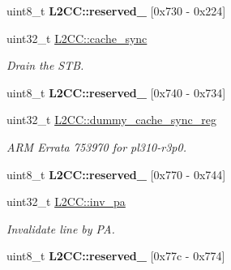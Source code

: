 \begin{DoxyCompactItemize}
\mbox{\label{group__L2C-310__cache_gadf1c6bcb154f6b1ddc8225cc3deb82ec}} 
uint8\+\_\+t {\bfseries L2\+C\+C\+::reserved\+\_} \mbox{[}0x730 -\/ 0x224\mbox{]}
\item 
\mbox{\label{group__L2C-310__cache_ga303119e21f6e6fd7d5026b3db7cbbdd6}} 
uint32\+\_\+t \mbox{\hyperlink{group__L2C-310__cache_ga303119e21f6e6fd7d5026b3db7cbbdd6}{L2\+C\+C\+::cache\+\_\+sync}}
\begin{DoxyCompactList}\small\item\em Drain the S\+TB. \end{DoxyCompactList}\item 
\mbox{\label{group__L2C-310__cache_gaafb6b66d6a35a3015bd43d66f7f92c7d}} 
uint8\+\_\+t {\bfseries L2\+C\+C\+::reserved\+\_} \mbox{[}0x740 -\/ 0x734\mbox{]}
\item 
\mbox{\label{group__L2C-310__cache_ga36cd1592fd2c87b1c90d03d2bb2e946d}} 
uint32\+\_\+t \mbox{\hyperlink{group__L2C-310__cache_ga36cd1592fd2c87b1c90d03d2bb2e946d}{L2\+C\+C\+::dummy\+\_\+cache\+\_\+sync\+\_\+reg}}
\begin{DoxyCompactList}\small\item\em A\+RM Errata 753970 for pl310-\/r3p0. \end{DoxyCompactList}\item 
\mbox{\label{group__L2C-310__cache_ga260b3ccd136273f7cca0b3cbd89ce4ab}} 
uint8\+\_\+t {\bfseries L2\+C\+C\+::reserved\+\_} \mbox{[}0x770 -\/ 0x744\mbox{]}
\item 
\mbox{\label{group__L2C-310__cache_ga30a718a7bfad6c71dea00321954187a8}} 
uint32\+\_\+t \mbox{\hyperlink{group__L2C-310__cache_ga30a718a7bfad6c71dea00321954187a8}{L2\+C\+C\+::inv\+\_\+pa}}
\begin{DoxyCompactList}\small\item\em Invalidate line by PA. \end{DoxyCompactList}\item 
\mbox{\label{group__L2C-310__cache_gaa8a741d171e5c85b816548ac2aec1f1d}} 
uint8\+\_\+t {\bfseries L2\+C\+C\+::reserved\+\_} \mbox{[}0x77c -\/ 0x774\mbox{]}

\end{DoxyCompactItemize}
